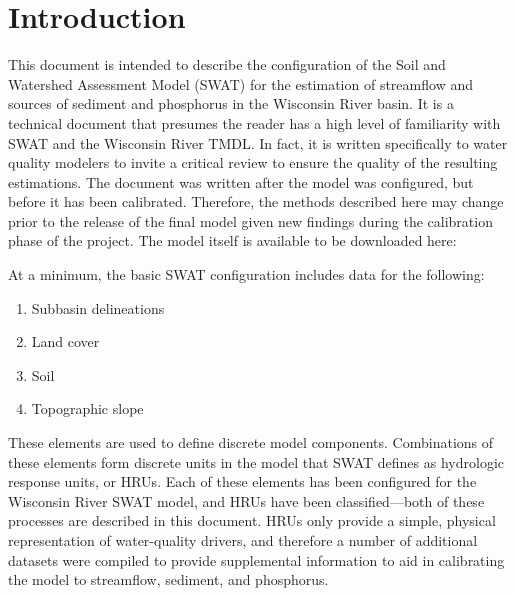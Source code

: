 \section{Introduction}
This document is intended to describe the configuration of the Soil and
Watershed Assessment Model (SWAT) for the estimation of streamflow and sources
of sediment and phosphorus in the Wisconsin River basin. It is a technical
document that presumes the reader has a high level of familiarity with SWAT and
the Wisconsin River TMDL. In fact, it is written specifically to water quality
modelers to invite a critical review to ensure the quality of the resulting
estimations. The document was written after the model was configured, but before
it has been calibrated. Therefore, the methods described here may change prior
to the release of the final model given new findings during the calibration
phase of the project. The model itself is available to be downloaded here:

At a minimum, the basic SWAT configuration includes data for the following:

\begin{enumerate}
	\item Subbasin delineations
	\item Land cover
	\item Soil
	\item Topographic slope
\end{enumerate}

These elements are used to define discrete model components. Combinations of
these elements form discrete units in the model that SWAT defines as hydrologic
response units, or HRUs. Each of these elements has been configured for the
Wisconsin River SWAT model, and HRUs have been classified---both of these
processes are described in this document. HRUs only provide a simple, physical
representation of water-quality drivers, and therefore a number of additional
datasets were compiled to provide supplemental information to aid in calibrating
the model to streamflow, sediment, and phosphorus.

